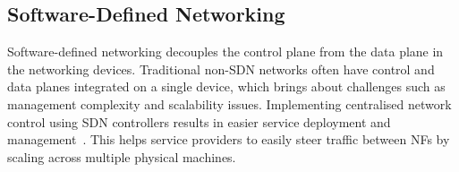 \documentclass[futureinternet,review,accept,pdftex,moreauthors]{Definitions/mdpi}
\begin{document}
\subsection{Software-Defined Networking}
\label{SDN_Overview}
Software-defined networking decouples the control plane from the data plane in the networking devices. Traditional non-SDN networks often have control and data planes integrated on a single device, which brings about challenges such as management complexity and scalability issues. Implementing centralised network control using SDN controllers results in easier service deployment and management~\cite{sarmiento2021decentralized}. This helps service providers to easily steer traffic between NFs by scaling across multiple physical machines. 

\end{document}
